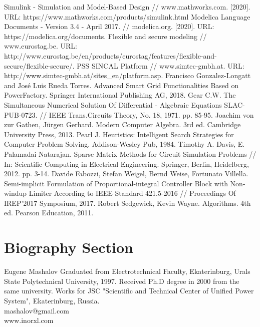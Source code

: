 \documentclass[lettersize,journal]{IEEEtran}
\begin{document}
\begin{thebibliography}{1}

Simulink - Simulation and Model-Based Design // www.mathworks.com. [2020]. URL: https://www.mathworks.com/products/simulink.html
Modelica Language Documents - Version 3.4 - April 2017. // modelica.org. [2020]. URL: https://modelica.org/documents. 
Flexible and secure modeling // www.eurostag.be. URL: http://www.eurostag.be/en/products/eurostag/features/flexible-and-secure/flexible-secure/.
PSS SINCAL Platform // www.simtec-gmbh.at. URL: http://www.simtec-gmbh.at/sites\_en/platform.asp.
Francisco Gonzalez-Longatt and Jos{\'{e}} Luis Rueda Torres. Advanced Smart Grid Functionalities Based on PowerFactory. Springer International Publishing AG, 2018.
Gear C.W. The Simultaneous Numerical Solution Of Differential - Algebraic Equations SLAC-PUB-0723. // IEEE Trans.Circuits Theory, No. 18, 1971. pp. 85-95.
Joachim von zur Gathen, Jürgen Gerhard. Modern Computer Algebra. 3rd ed. Cambridge University Press, 2013.
Pearl J. Heuristics: Intelligent Search Strategies for Computer Problem Solving. Addison-Wesley Pub, 1984.
Timothy A. Davis, E. Palamadai Natarajan. Sparse Matrix Methods for Circuit Simulation Problems // In: Scientific Computing in Electrical Engineering. Springer, Berlin, Heidelberg, 2012. pp. 3-14.
Davide Fabozzi, Stefan Weigel, Bernd Weise, Fortunato Villella. Semi-implicit Formulation of Proportional-integral Controller Block with Non-windup Limiter According to IEEE Standard 421.5-2016 // Proceedings Of IREP'2017 Symposium, 2017.
Robert Sedgewick, Kevin Wayne.  Algorithms. 4th ed. Pearson Education, 2011.
\end{thebibliography}

\newpage
\section{Biography Section}
\vspace{-33pt}
\begin{IEEEbiography}{Eugene Mashalov}
Graduated from Electrotechnical Faculty, Ekaterinburg, Urals State Polytechnical University, 1997. 
Received Ph.D degree in 2000 from the same university. 
Works for JSC "Scientific and Technical Center of Unified Power System", Ekaterinburg, Russia.\\
mashalov@gmail.com \\
www.inorxl.com
\end{IEEEbiography}
\vfill
\end{document}
